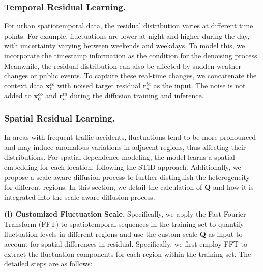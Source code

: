 \subsubsection*{\textbf{Temporal Residual Learning.}} 
For urban spatiotemporal data, the residual distribution varies at different time points. For example, fluctuations are lower at night and higher during the day, with uncertainty varying between weekends and weekdays. To model this, we incorporate the timestamp information as the condition for the denoising process. Meanwhile, the residual distribution can also be affected by sudden weather changes or public events. To capture these real-time changes, we concatenate the context data $\mathbf{x}^{co}_0$ with noised target residual $\mathbf{r}^{ta}_n$ as the input. The noise is not added to $\mathbf{x}^{co}_0$ and $\mathbf{r}^{ta}_n$ during the diffusion training and inference.




\subsubsection*{\textbf{Spatial Residual Learning.}}
In areas with frequent traffic accidents, fluctuations tend to be more pronounced and may induce anomalous variations in adjacent regions, thus affecting their distributions.
For spatial dependence modeling, the model learns a spatial embedding for each location, following the STID approach. Additionally, we propose a scale-aware diffusion process to further distinguish the heterogeneity for different regions. In this section, we detail the calculation of \(\mathbf{Q}\) and how it is integrated into the scale-aware diffusion process.

\noindent\textbf{(i) Customized Fluctuation Scale.} Specifically, we apply the Fast Fourier Transform (FFT) to spatiotemporal sequences in the training set to quantify fluctuation levels in different regions and use the custom scale \(\mathbf{Q}\) as input to account for spatial differences in residual. Specifically, we first employ FFT to extract the fluctuation components for each region within the training set. The detailed steps are as follows:










